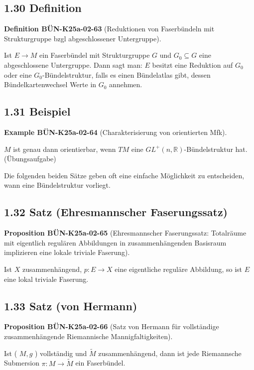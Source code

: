 \documentclass[10pt, letterpaper]{article}
\newcommand{\CustomHeading}[3]{%
  \par\medskip\noindent%
  \textbf{#1 #2} \textnormal{(#3)}.\enskip%
}
\newenvironment{DEF}[2]{\begin{unitbox}\CustomHeading{Definition}{#1}{#2}}{\end{unitbox}}
\newenvironment{PROP}[2]{\begin{unitbox}\CustomHeading{Proposition}{#1}{#2}}{\end{unitbox}}
\newenvironment{EXA}[2]{\begin{unitbox}\CustomHeading{Example}{#1}{#2}}{\end{unitbox}}
\begin{document}
\subsection*{1.30 Definition}
\begin{DEF}{BÜN-K25a-02-63}{Reduktionen von Faserbündeln mit Strukturgruppe bzgl abgeschlossener Untergruppe}
Ist $E \rightarrow M$ ein Faserbündel mit Strukturgruppe $G$ und $G_{0} \subseteq G$ eine abgeschlossene Untergruppe. Dann sagt man: $E$ besitzt eine Reduktion auf $G_{0}$ oder eine $G_{0}$-Bündelstruktur, falls es einen Bündelatlas gibt, dessen Bündelkartenwechsel Werte in $G_{0}$ annehmen.
\end{DEF}

\subsection*{1.31 Beispiel}
\begin{EXA}{BÜN-K25a-02-64}{Charakterisierung von orientierten Mfk}
$M$ ist genau dann orientierbar, wenn $T M$ eine $G L^{+}(n, \mathbb{R})$-Bündelstruktur hat. (Übungsaufgabe)
\end{EXA}

Die folgenden beiden Sätze geben oft eine einfache Möglichkeit zu entscheiden, wann eine Bündelstruktur vorliegt.

\subsection*{1.32 Satz (Ehresmannscher Faserungssatz)}

\begin{PROP}{BÜN-K25a-02-65}{Ehresmannscher Faserungssatz: Totalräume mit eigentlich regulären Abbildungen in zusammenhängenden Basisraum implizieren eine lokale triviale Faserung}
Ist $X$ zusammenhängend, $p: E \rightarrow X$ eine eigentliche reguläre Abbildung, so ist $E$ eine lokal triviale Faserung.
\end{PROP}

\subsection*{1.33 Satz (von Hermann)}

\begin{PROP}{BÜN-K25a-02-66}{Satz von Hermann für vollständige zusammenhängende Riemannische Mannigfaltigkeiten}
Ist ( $M, g$ ) vollständig und $\tilde{M}$ zusammenhängend, dann ist jede Riemannsche Submersion $\pi: M \rightarrow \tilde{M}$ ein Faserbündel.
\end{PROP}
\end{document}
